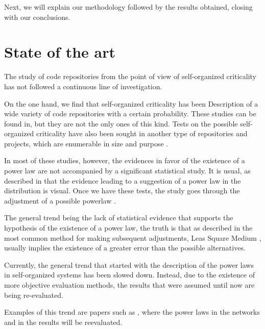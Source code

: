 \documentclass[conference]{IEEEtran}
\begin{document}
Next, we will explain our methodology followed by the results obtained,
closing with our conclusions. 



\section{State of the art}\label{soa}

The study of code repositories from the point of view of self-organized criticality has not followed a continuous line of investigation.

On the one hand, we find that self-organized criticality has been
Description of a wide variety of code repositories with a certain probability. These studies can be found in\cite{wu2007empirical,gorshenev2004punctuated}, but they are not the only ones of this kind. Tests on the possible self-organized criticality have also been sought in another type of repositories and projects, which are enumerable in size and purpose \cite{Merelo2016:repomining,merelo16:slash,merelo16:self,merelo2017self}.

In most of these studies, however, the evidences in favor of the existence of a power law are not accompanied by a significant statistical study. It is usual, as described in \cite{newman2005power} that the evidence leading to a suggestion of a power law in the distribution is visual. Once we have these tests, the study goes through the adjustment of a possible powerlaw \cite{merelo2017self,arafat2009commit}.

The general trend being the lack of statistical evidence that supports the hypothesis of the existence of a power law, the truth is that as described in \cite{newman2005power, clauset2009power} the most common method for making subsequent adjustments, Leas Square Medium \cite{merelo2017self,arafat2009commit,merelo16:self}, usually implies the existence of a greater error than the possible alternatives.

Currently, the general trend that started with the description of the power laws in self-organized systems has been slowed down. Instead, due to the existence of more objective evaluation methods, the results that were assumed until now are being re-evaluated.

Examples of this trend are papers such as \cite{Holme2019, Broido2019}, where the power laws in the networks and in the results will be reevaluated.

\cite{Jones2003}
\cite{voitalov2018scale}
\cite{Stumpf665}
\end{document}
